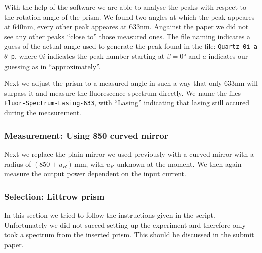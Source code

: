 \documentclass[../../main.tex]{subfiles}
\begin{document}
        With the help of the software we are able to analyse the peaks with respect to the rotation angle of the prism. We found two angles at which the peak appeares at $640\si{\nm}$, every other peak appeares at $633\si{\nm}$. Angainst the paper we did not see any other peaks \enquote{close to} those measured ones. The file naming indicates a guess of the actual angle used to generate the peak found in the file: \texttt{Quartz-0i-a}$\theta$\texttt{-p}, where $0i$ indicates the peak number starting at $\beta=0\si{\degree}$ and $a$ indicates our guessing as in \enquote{approximately}. 

        Next we adjust the prism to a measured angle in such a way that only $633\si{\nm}$ will surpass it and measure the fluorescence spectrum directly. We name the files \texttt{Fluor-Spectrum-Lasing-633}, with \enquote{Lasing} indicating that lasing still occured during the measurement.

    \subsubsection{Measurement: Using 850 curved mirror}
        Next we replace the plain mirror we used previously with a curved mirror with a radius of $(850\pm u_R)\,\si{\mm}$, with $u_R$ unknown at the moment. We then again measure the output power dependent on the input current. 


    \subsubsection{Selection: Littrow prism}
        In this section we tried to follow the instructions given in the script. Unfortunately we did not succed setting up the experiment and therefore only took a spectrum from the inserted prism. This should be discussed in the submit paper. 
\end{document}
